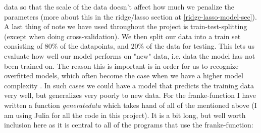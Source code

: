 \documentclass{article}
\begin{document}
data so that the scale of the data doesn't affect how much we penalize the
parameters (more about this in the ridge/lasso section at
\ref{ridge-lasso-model-sec}).
\\
A last thing of note we have used throughout the project is train-test-splitting
(except when doing cross-validation). We then split our data into a train set
consisting of $80\%$ of the datapoints, and $20\%$ of the data for testing.
This lets us evaluate how well our model performs on "new" data, i.e. data the
model has not been trained on. The reason this is important is in order for us
to recognize overfitted models, which often become the case when we have a
higher model complexity \cite[s.~7.2]{hastie2009elements}. In such cases we
could have a model that predicts the training data very well, but generalizes
very poorly to new data.  For the franke-function I have written a function
\textit{generatedata} which takes hand of all of the mentioned above (I am using
Julia for all the code in this project). It is a bit long, but well worth
inclusion here as it is central to all of the programs that use the
franke-function:
\end{document}
